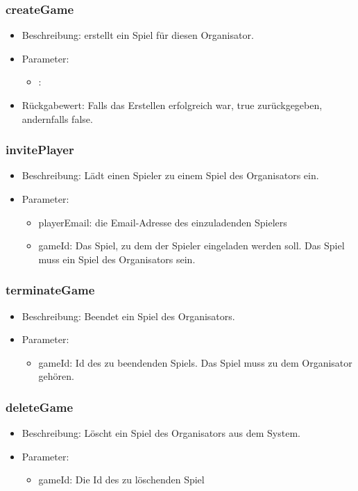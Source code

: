 \documentclass[a4paper]{scrreprt}
\begin{document}
	\subsubsection{createGame}
	\begin{itemize}
		\item Beschreibung: erstellt ein Spiel für diesen Organisator.
		\item Parameter: %
		\begin{itemize}
			\item :
		\end{itemize}
		\item Rückgabewert: Falls das Erstellen erfolgreich war, true zurückgegeben, andernfalls false.
	\end{itemize}
	\subsubsection{invitePlayer}
	\begin{itemize}
		\item Beschreibung: Lädt einen Spieler zu einem Spiel des Organisators ein.
		\item Parameter:
		\begin{itemize}
			\item playerEmail: die Email-Adresse des einzuladenden Spielers
			\item gameId: Das Spiel, zu dem der Spieler eingeladen werden soll. Das Spiel muss ein Spiel des Organisators sein.
		\end{itemize}
	\end{itemize}
	\subsubsection{terminateGame}
	\begin{itemize}
		\item Beschreibung: Beendet ein Spiel des Organisators.
		\item Parameter:
		\begin{itemize}
			\item gameId: Id des zu beendenden Spiels. Das Spiel muss zu dem Organisator gehören.
		\end{itemize}
	\end{itemize}
	\subsubsection{deleteGame}
	\begin{itemize}
		\item Beschreibung: Löscht ein Spiel des Organisators aus dem System.
		\item Parameter:
		\begin{itemize}
			\item gameId: Die Id des zu löschenden Spiel
		\end{itemize}
	\end{itemize}
\end{document}
